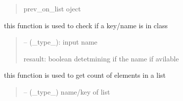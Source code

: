 \documentclass[letterpaper,10pt,english]{sphinxmanual}
\begin{document}
\begin{savenotes}
\begin{fulllineitems}
\begin{savenotes}
\begin{fulllineitems}
\begin{quote}
\begin{description}
\sphinxAtStartPar
prev\_on\_list oject

\end{description}\end{quote}

\end{fulllineitems}\end{savenotes}


\begin{savenotes}\begin{fulllineitems}
\label{\detokenize{setting/utils/move_on_list:oxin.utils.move_on_list.moveOnList.check}}
\pysigstartsignatures
{}
\pysigstopsignatures
\sphinxAtStartPar
this function is used to check if a key/name is in class
\begin{quote}\begin{description}
\sphinxAtStartPar
{} – (\_type\_): input name

\sphinxAtStartPar
resault: boolean detetmining if the name if avilable

\end{description}\end{quote}

\end{fulllineitems}\end{savenotes}


\begin{savenotes}\begin{fulllineitems}
\label{\detokenize{setting/utils/move_on_list:oxin.utils.move_on_list.moveOnList.get_count}}
\pysigstartsignatures
{}
\pysigstopsignatures
\sphinxAtStartPar
this function is used to get count of elements in a list
\begin{quote}\begin{description}
\sphinxAtStartPar
{} – (\_type\_) name/key of list


\end{description}
\end{quote}
\end{fulllineitems}
\end{savenotes}
\end{fulllineitems}
\end{savenotes}
\end{document}
